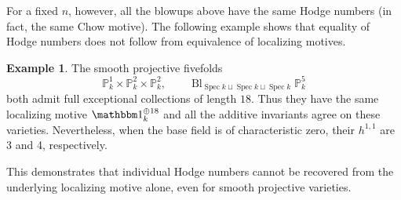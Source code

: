 \documentclass{amsart}
\theoremstyle{plain}
\theoremstyle{definition}
\newtheorem{example}[prop]{Example}
\newcommand{\bbP}{\mathbb{P}}
\DeclareMathOperator{\Spec}{Spec}
\begin{document}
For a fixed $n$, however, all the blowups above have the same Hodge numbers (in fact, the same Chow motive).
The following example shows that equality of Hodge numbers does not follow from equivalence of localizing motives. 

\begin{example}\label{examplemotivesforgetHodge}
The smooth projective fivefolds
$$ \bbP^1_k\times\bbP^2_k\times\bbP^2_k, \qquad \operatorname{Bl}_{\Spec k\sqcup\Spec k\sqcup \Spec k}\bbP_k^5 $$
both admit full exceptional collections of length $18$. Thus they have the same localizing motive $\mathbbm 1_k^{\oplus 18}$ and all the additive invariants agree on these varieties. Nevertheless, when the base field is of characteristic zero, their $h^{1,1}$ are 3 and 4, respectively.
\end{example}

This demonstrates that individual Hodge numbers cannot be recovered from the underlying localizing motive alone, even for smooth projective varieties.
\end{document}
